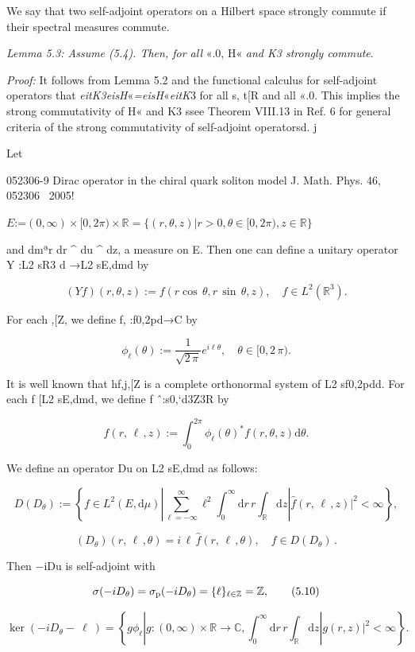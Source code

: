 \documentclass{article}
\begin{document}
We say that two self-adjoint operators on a Hilbert space strongly commute if their spectral measures commute.

\textit{Lemma 5.3: Assume (5.4). Then, for all} «.0, H« \textit{and K3 strongly commute}.

\textit{Proof:} It follows from Lemma 5.2 and the functional calculus for self-adjoint operators that \textit{eitK3eisH}«\textit{=eisH}«\textit{eitK}3 for all s, t[R and all «.0. This implies the strong commutativity of H« and K3 ssee Theorem VIII.13 in Ref. 6 for general criteria of the strong commutativity of self-adjoint operatorsd. j

Let

052306-9 Dirac operator in the chiral quark soliton model J. Math. Phys. 46, 052306 ~2005!

$E$:=$(0,\infty)\times[0,2\pi)\times\mathbb{R}=\{(r,\theta,z)|r>0,\theta\in[0,2\pi),z\in\mathbb{R}\}$

and dmªr dr ^ du ^ dz, a measure on E. Then one can define a unitary operator Y :L2 sR3 d →L2 sE,dmd by

$$(Y f)(r,\theta,z):=f(r\cos\,\theta,r\,\sin\,\theta,z),\quad f\in L^{2}(\mathbb{R}^{3}).$$

For each ,[Z, we define f, :f0,2pd→C by

$$\phi_{\ell}(\theta):=\frac{1}{\sqrt{2\,\pi}}e^{i\ell\theta},\quad\theta\in[0,2\,\pi).\tag{5.9}$$

It is well known that hf,j,[Z is a complete orthonormal system of L2 sf0,2pdd. For each f [L2 sE,dmd, we define f ˆ:s0,`d3Z3R by

$$\hat{f}(r,\,\ell\,,z){:=}\int_{0}^{2\pi}\phi_{\ell}(\theta)^{*}f(r,\theta,z)\mathrm{d}\theta.$$

We define an operator Du on L2 sE,dmd as follows:

$$D(D_{\theta})\!:=\!\left\{f\!\in\!L^{2}(E,\mathrm{d}\mu)|\sum_{\ell=-\infty}^{\infty}\ell^{2}\!\int_{0}^{\infty}\mathrm{d}r\,r\!\int_{\mathbb{R}}\mathrm{d}z|\widehat{f}(r,\,\ell\,,z)|^{2}<\infty\right\},$$

$$(D_{\theta})(r,\,\ell\,,\theta)=i\,\ell\,\widehat{f}(r,\,\ell\,,\theta),\quad f\!\in\!D(D_{\theta})\,.$$

Then −iDu is self-adjoint with

$$\sigma(-iD_{\theta})=\sigma_{\rm p}(-iD_{\theta})=\{\ell\}_{\ell\in\mathbb{Z}}=\mathbb{Z},\tag{5.10}$$

$$\ker(-iD_{\theta}-\ \ell\ )=\left\{g\phi_{\ell}|g\colon(0,\infty)\times\mathbb{R}\to\mathbb{C},\int_{0}^{\infty}\mathrm{d}r\,r\int_{\mathbb{R}}\mathrm{d}z|g(r,z)|^{2}<\infty\right\}.\tag{5.11}$$
\end{document}
